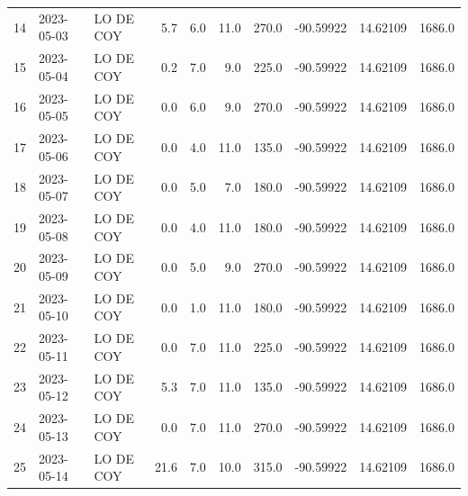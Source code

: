 \documentclass[12pt]{article}
\begin{document}
\begin{center}
\begin{tabular}{lllrrrrrrr}
14  & 2023-05-03 &  LO DE COY &     5.7 &  6.0 &        11.0 &       270.0 & -90.59922 &  14.62109 &   1686.0 \\
15  & 2023-05-04 &  LO DE COY &     0.2 &  7.0 &         9.0 &       225.0 & -90.59922 &  14.62109 &   1686.0 \\
16  & 2023-05-05 &  LO DE COY &     0.0 &  6.0 &         9.0 &       270.0 & -90.59922 &  14.62109 &   1686.0 \\
17  & 2023-05-06 &  LO DE COY &     0.0 &  4.0 &        11.0 &       135.0 & -90.59922 &  14.62109 &   1686.0 \\
18  & 2023-05-07 &  LO DE COY &     0.0 &  5.0 &         7.0 &       180.0 & -90.59922 &  14.62109 &   1686.0 \\
19  & 2023-05-08 &  LO DE COY &     0.0 &  4.0 &        11.0 &       180.0 & -90.59922 &  14.62109 &   1686.0 \\
20  & 2023-05-09 &  LO DE COY &     0.0 &  5.0 &         9.0 &       270.0 & -90.59922 &  14.62109 &   1686.0 \\
21  & 2023-05-10 &  LO DE COY &     0.0 &  1.0 &        11.0 &       180.0 & -90.59922 &  14.62109 &   1686.0 \\
22  & 2023-05-11 &  LO DE COY &     0.0 &  7.0 &        11.0 &       225.0 & -90.59922 &  14.62109 &   1686.0 \\
23  & 2023-05-12 &  LO DE COY &     5.3 &  7.0 &        11.0 &       135.0 & -90.59922 &  14.62109 &   1686.0 \\
24  & 2023-05-13 &  LO DE COY &     0.0 &  7.0 &        11.0 &       270.0 & -90.59922 &  14.62109 &   1686.0 \\
25  & 2023-05-14 &  LO DE COY &    21.6 &  7.0 &        10.0 &       315.0 & -90.59922 &  14.62109 &   1686.0 \\
\bottomrule
\end{tabular}

        
        \end{center}
        
\end{document}
